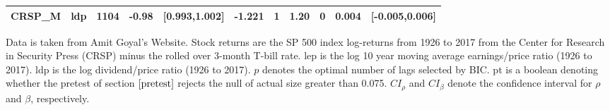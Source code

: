 \documentclass{article}
\begin{document}
\begin{table}[ht]
\begin{threeparttable}
\begin{tabular}{llrrlrrrrrl}
  CRSP\_M & ldp & 1104 & -0.98 & [0.993,1.002] & -1.221 & 1 & 1.20 & 0 & 0.004 & [-0.005,0.006] \\ 
\hline
\end{tabular}
 \begin{tablenotes}
 \small
\item Data is taken from Amit Goyal’s Website. Stock returns are the SP 500 index log-returns from 1926 to 2017 from the Center for Research in Security Press (CRSP) minus the rolled over 3-month T-bill rate. lep is the log 10 year moving average earnings/price ratio (1926 to 2017). ldp is the log dividend/price ratio (1926 to 2017).
$p$ denotes the optimal number of lags selected by BIC. pt is a boolean denoting whether the pretest of section $\ref{pretest}$ rejects the null of actual size greater than 0.075. $CI_{\rho}$ and $CI_{\beta}$ denote the confidence interval for $\rho$ and $\beta$, respectively.
\end{tablenotes}
\end{threeparttable}
\end{table}
\end{document}

